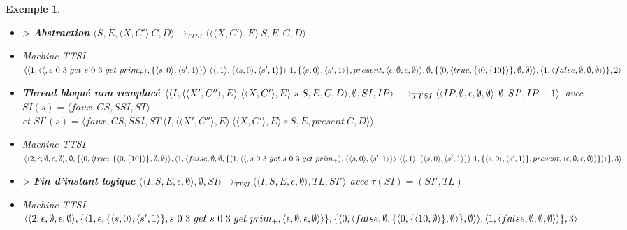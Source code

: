 \documentclass[10pt,a4paper]{report}
\newtheorem{ex}{Exemple}
\begin{document}
\begin{ex}
\begin{itemize}
			\item[] > \textbf{Abstraction} $\langle S,E,\langle X,C'\rangle~C,D\rangle
			\longrightarrow_{TTSI} 
			\langle \langle\langle X,C'\rangle,E\rangle~S,E,C,D\rangle$
			\item[] Machine TTSI $\langle\langle 1,\langle\langle,s~0~3~get~s~0~3~get~prim_{+}\rangle,\{\langle s,0\rangle,\langle s',1\rangle\}\rangle~\langle\langle,1\rangle,\{\langle s,0\rangle,\langle s',1\rangle\}\rangle~1,\{\langle s,0\rangle,\langle s',1\rangle\},present ,\langle\epsilon,\emptyset,\epsilon,\emptyset\rangle\rangle,\\\emptyset,\{\langle 0,\langle true,\{\langle 0,\{10\}\rangle\},\emptyset,\emptyset\rangle\rangle,\langle 1,\langle false,\emptyset,\emptyset,\emptyset\rangle\rangle\},2\rangle$
			\item[] \textbf{Thread bloqué non remplacé } $\langle\langle I,\langle\langle X',C''\rangle,E\rangle~\langle\langle X,C'\rangle,E\rangle~s~S,E,C,D\rangle,\emptyset,SI,IP\rangle 
			\longrightarrow_{TTSI} 
			\\\langle\langle IP,\emptyset,\epsilon,\emptyset,\emptyset\rangle,\emptyset,SI',IP+1\rangle$
			avec $SI(s) = \langle faux,CS,SSI,ST\rangle$
			\\et $SI'(s) = \langle faux,CS,SSI,ST~\langle I,\langle\langle X',C''\rangle,E\rangle~\langle\langle X,C'\rangle,E\rangle~s~S,E,present~C,D\rangle\rangle$
			\item[] Machine TTSI $\langle\langle 2,\epsilon,\emptyset,\epsilon,\emptyset\rangle,\emptyset,\{\langle 0,\langle true,\{\langle 0,\{10\}\rangle\},\emptyset,\emptyset\rangle\rangle,\langle 1,\langle false,\emptyset,\emptyset,\{\langle 1,\langle\langle,s~0~3~get~s~0~3~get~prim_{+}\rangle,\\\{\langle s,0\rangle,\langle s',1\rangle\}\rangle~\langle\langle,1\rangle, \{\langle s,0\rangle,\langle s',1\rangle\}\rangle~1,\{\langle s,0\rangle,\langle s',1\rangle\},present ,\langle\epsilon,\emptyset,\epsilon,\emptyset\rangle\rangle\}\rangle\rangle\},3\rangle$
			\item[] > \textbf{Fin d'instant logique} $\langle\langle I,S,E,\epsilon,\emptyset \rangle ,\emptyset,SI\rangle 
			\longrightarrow_{TTSI} 
			\langle\langle I,S,E,\epsilon,\emptyset\rangle,TL,SI'\rangle$
			avec $\tau(SI) = (SI',TL)$
			\item[] Machine TTSI $\langle\langle 2,\epsilon,\emptyset,\epsilon,\emptyset\rangle,\{\langle 1,\epsilon,\{\langle s,0\rangle,\langle s',1\rangle\},s~0~3~get~s~0~3~get~prim_{+} ,\langle\epsilon,\emptyset,\epsilon,\emptyset\rangle\rangle\},\\\{\langle 0,\langle false,\emptyset,\{\langle 0,\{\langle 10,\emptyset\rangle\},\emptyset\rangle\},\emptyset\rangle\rangle,\langle 1,\langle false,\emptyset,\emptyset,\emptyset\rangle\rangle\},3\rangle$ 

\end{itemize}
\end{ex}
\end{document}
